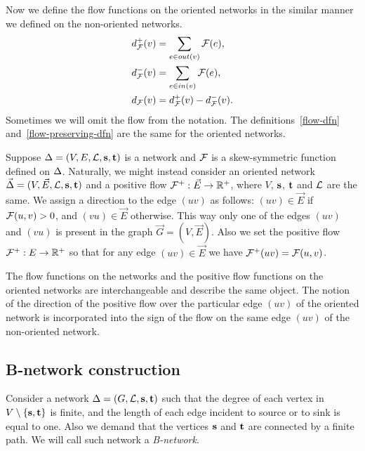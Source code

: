 \documentclass[12pt,oneside,a4paper]{amsart}
\begin{document}
      Now we define the flow functions on the oriented networks in the similar manner we defined on the non-oriented networks.
      \begin{align*}
        &d^{+}_{\mathcal{F}}(v) = \sum_{e \in out(v)} \mathcal{F}(e),\\
        &d^{-}_{\mathcal{F}}(v) = \sum_{e \in in(v)} \mathcal{F}(e),\\
        &d_{\mathcal{F}}(v) = d^{+}_{\mathcal{F}}(v) - d^{-}_{\mathcal{F}}(v).
      \end{align*}
      Sometimes we will omit the flow from the notation.
      The definitions~\ref{flow-dfn} and~\ref{flow-preserving-dfn} are the same for the oriented networks.
      \bigskip

      Suppose $\Delta = (V, E, \mathcal{L}, \mathbf{s}, \mathbf{t})$ is a network and $\mathcal{F}$ is a skew-symmetric function defined
        on $\Delta$.
      Naturally, we might instead consider an oriented network $\vec{\Delta} = (V, \vec{E}, \mathcal{L}, \mathbf{s}, \mathbf{t})$ and a
        positive flow $\mathcal{{F}^{+}}: \vec{E} \to \mathbb{R}^{+}$, where $V$, $\mathbf{s}$, $\mathbf{t}$ and $\mathcal{L}$ are the same.
      We assign a direction to the edge $(uv)$ as follows:
        $(uv) \in \vec{E}$ if $\mathcal{F}(u, v) > 0$, and $(vu) \in \vec{E}$ otherwise.
      This way only one of the edges $(uv)$ and $(vu)$ is present in the graph $\vec{G} = (V, \vec{E})$.
      Also we set the positive flow $\mathcal{{F}^{+}}: E \to \mathbb{R}^{+}$ so that
        for any edge $(uv) \in \vec{E}$ we have $\mathcal{{F}^{+}}(u v) = \mathcal{F}(u,v)$.
      \begin{remark}
        The flow functions on the networks and the positive flow functions on the oriented networks
          are interchangeable and describe the same object.
        The notion of the direction of the positive flow over the particular edge $(uv)$ of the oriented network
          is incorporated into the sign of the flow on the same edge $(uv)$ of the non-oriented network.
      \end{remark}

    \medskip
    \subsection{B-network construction}
      \begin{definition}
        Consider a network $\Delta = (G, \mathcal{L}, \mathbf{s}, \mathbf{t})$ such that
          the degree of each vertex in $V \setminus \{\mathbf{s}, \mathbf{t}\} $ is finite,
          and the length of each edge incident to source or to sink is equal to one.
        Also we demand that the vertices $\mathbf{s}$ and $\mathbf{t}$ are connected by a finite path.
        We will call such network a \emph{B-network}.
      \end{definition}
\end{document}
